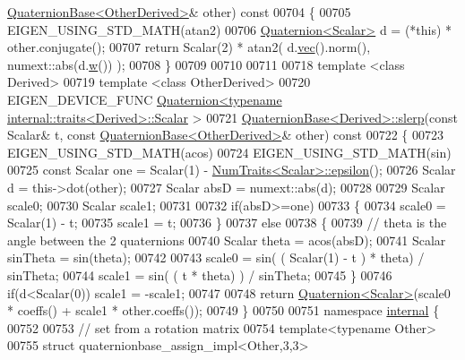 \begin{DoxyCode}
{      \hyperlink{group___geometry___module_class_eigen_1_1_quaternion_base}{QuaternionBase<OtherDerived>}& other)\textcolor{keyword}{ const}
00704 \textcolor{keyword}{}\{
00705   EIGEN\_USING\_STD\_MATH(atan2)
00706   \hyperlink{group___geometry___module_class_eigen_1_1_quaternion}{Quaternion<Scalar>} d = (*this) * other.conjugate();
00707   \textcolor{keywordflow}{return} Scalar(2) * atan2( d.\hyperlink{group___geometry___module_aa8a52640dfd34f910d18f110ccccd1b9}{vec}().norm(), numext::abs(d.\hyperlink{group___geometry___module_a1f3f580927483150d4558c327988a9b4}{w}()) );
00708 \}
00709 
00710  
00711     
00718 \textcolor{keyword}{template} <\textcolor{keyword}{class} Derived>
00719 \textcolor{keyword}{template} <\textcolor{keyword}{class} OtherDerived>
00720 EIGEN\_DEVICE\_FUNC \hyperlink{group___geometry___module_class_eigen_1_1_quaternion}{Quaternion<typename internal::traits<Derived>::Scalar}
      >
00721 \hyperlink{group___geometry___module_class_eigen_1_1_quaternion_base}{QuaternionBase<Derived>::slerp}(\textcolor{keyword}{const} Scalar& t, \textcolor{keyword}{const} 
      \hyperlink{group___geometry___module_class_eigen_1_1_quaternion_base}{QuaternionBase<OtherDerived>}& other)\textcolor{keyword}{ const}
00722 \textcolor{keyword}{}\{
00723   EIGEN\_USING\_STD\_MATH(acos)
00724   EIGEN\_USING\_STD\_MATH(sin)
00725   \textcolor{keyword}{const} Scalar one = Scalar(1) - \hyperlink{group___core___module_struct_eigen_1_1_num_traits}{NumTraits<Scalar>::epsilon}();
00726   Scalar d = this->dot(other);
00727   Scalar absD = numext::abs(d);
00728 
00729   Scalar scale0;
00730   Scalar scale1;
00731 
00732   \textcolor{keywordflow}{if}(absD>=one)
00733   \{
00734     scale0 = Scalar(1) - t;
00735     scale1 = t;
00736   \}
00737   \textcolor{keywordflow}{else}
00738   \{
00739     \textcolor{comment}{// theta is the angle between the 2 quaternions}
00740     Scalar theta = acos(absD);
00741     Scalar sinTheta = sin(theta);
00742 
00743     scale0 = sin( ( Scalar(1) - t ) * theta) / sinTheta;
00744     scale1 = sin( ( t * theta) ) / sinTheta;
00745   \}
00746   \textcolor{keywordflow}{if}(d<Scalar(0)) scale1 = -scale1;
00747 
00748   \textcolor{keywordflow}{return} \hyperlink{group___geometry___module_class_eigen_1_1_quaternion}{Quaternion<Scalar>}(scale0 * coeffs() + scale1 * other.coeffs());
00749 \}
00750 
00751 \textcolor{keyword}{namespace }\hyperlink{namespaceinternal}{internal} \{
00752 
00753 \textcolor{comment}{// set from a rotation matrix}
00754 \textcolor{keyword}{template}<\textcolor{keyword}{typename} Other>
00755 \textcolor{keyword}{struct }quaternionbase\_assign\_impl<Other,3,3>
}
\end{DoxyCode}
